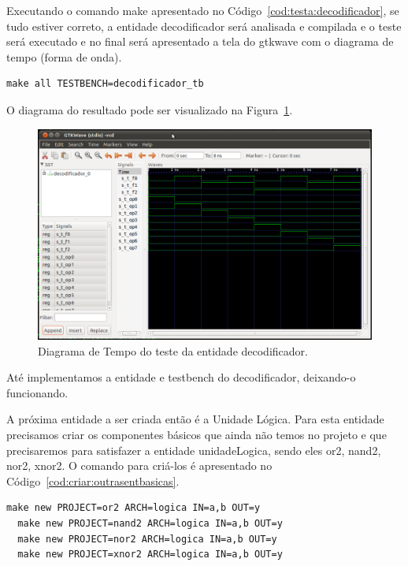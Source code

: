 \documentclass[a4paper,11pt]{report}
\begin{document}
Executando o comando make apresentado no Código~\ref{cod:testa:decodificador}, se tudo estiver correto, a entidade decodificador será analisada e compilada e o teste será executado e no final será apresentado a tela do gtkwave com o diagrama de tempo (forma de onda).

\lstset{numbers=left, numberstyle=\tiny, stepnumber=1, numbersep=3pt}
\begin{lstlisting}[label=cod:testa:decodificador,caption=Comando para executar o testbench da entidade decodificador.]
  make all TESTBENCH=decodificador_tb
\end{lstlisting}

O diagrama do resultado pode ser visualizado na Figura~\ref{fig:gtw:decodificador}.

\begin{figure}[H]
\centering
\includegraphics[width=1\textwidth]{figuras/gtw_decodificador.png}
\caption{Diagrama de Tempo do teste da entidade decodificador.}
\label{fig:gtw:decodificador}
\end{figure}

Até implementamos a entidade e testbench do decodificador, deixando-o funcionando.

A próxima entidade a ser criada então é a Unidade Lógica. Para esta entidade precisamos criar os componentes básicos que ainda não temos no projeto e que precisaremos para satisfazer a entidade unidadeLogica, sendo eles or2, nand2, nor2, xnor2. O comando para criá-los é apresentado no Código~\ref{cod:criar:outrasentbasicas}.

\lstset{numbers=left, numberstyle=\tiny, stepnumber=1, numbersep=3pt}
\begin{lstlisting}[label=cod:criar:outrasentbasicas,caption=Comando para a criar entidades básicas para a Unidade Lógica.]
  make new PROJECT=or2 ARCH=logica IN=a,b OUT=y
  make new PROJECT=nand2 ARCH=logica IN=a,b OUT=y
  make new PROJECT=nor2 ARCH=logica IN=a,b OUT=y
  make new PROJECT=xnor2 ARCH=logica IN=a,b OUT=y
\end{lstlisting}
\end{document}
